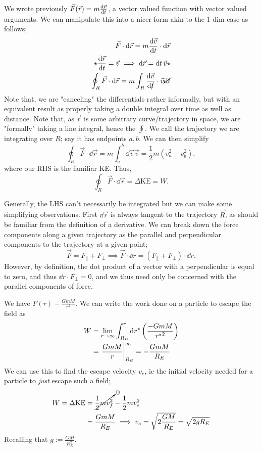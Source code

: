 \documentclass[12pt]{article}
\begin{document}
We wrote previously $\vec{F}(\vec{r}) = m \dv{\vec{v}}{t}$, a vector valued function with vector valued arguments. We can manipulate this into a nicer form akin to the 1-dim case as follows;
\begin{align*}
  \vec{F} \cdot \dd{\vec{r}} = m \dv{\vec{v}}{t} \cdot \dd{\vec{r}}\\
  \star \dv{\vec{r}}{t} = \vec{v} \implies \dd{\vec{r}} = \dd{t} \vec{v}\star\\
  \oint_R \vec{F} \cdot \dd{\vec{r}} = m \int_R\dv{\vec{v}}{\cancel{t}}\cdot \vec{v} \cancel{\dd{t}}
\end{align*}
Note that, we are "canceling" the differentials rather informally, but with an equivalent result as properly taking a double integral over time as well as distance. Note that, as $\vec{r}$ is some arbitrary curve/trajectory in space, we are "formally" taking a line integral, hence the $\oint$. We call the trajectory we are integrating over $R$; say it has endpoints $a,b$. We can then simplify\[
  \oint_R \vec{F} \cdot \dd{\vec{r}} = m \int_a^b \dd{\vec{v}} \vec{v} = \frac{1}{2}m \left(v_a^2 - v_b^2\right),\] where our RHS is the familiar KE. Thus, 
  \[\boxed{\oint_R \vec{F} \cdot \dd{\vec{r}} = \Delta \text{KE}= W.} \]

Generally, the LHS can't necessarily be integrated but we can make some simplifying observations. First $\dd{\vec{r}}$ is always tangent to the trajectory $\vec{R}$, as should be familiar from the definition of a derivative. We can break down the force components along a given trajectory as the parallel and perpendicular components to the trajectory at a given point; \[\vec{F} = F_{\parallel} + F_\perp \implies \vec{F} \cdot \dd{r} = (F_{\parallel} + F_\perp)\cdot \dd{r}.\] However, by definition, the dot product of a vector with a perpendicular is equal to zero, and thus $\dd{r} \cdot F_\perp = 0$, and we thus need only be concerned with the parallel components of force.

\begin{example}
  We have $F(r) - \frac{GmM}{r^2}$. We can write the work done on a particle to escape the field as \begin{align*}
    W &= \lim_{r \to \infty}\int_{R_E}^{r} \dd{r^*}\left(\frac{-GmM}{r{^*}^2}\right)\\
    &= \eval{\frac{GmM}{r}}_{R_E}^{\infty} = -\frac{GmM}{R_E}
  \end{align*}
  We can use this to find the escape velocity $v_e$, ie the initial velocity needed for a particle to \emph{just} escape such a field;
  \begin{align*}
    W = \Delta \text{KE} &= \cancelto{0}{\frac{1}{2}mv_f^2}-\frac{1}{2}mv_e^2\\
    &= \frac{GmM}{R_E} \implies v_e = \sqrt{2 \frac{GM}{R_E}}=\sqrt{2 g R_E}\\
  \end{align*} Recalling that $g:= \frac{GM}{R_E^2}$.
\end{example}
\end{document}
